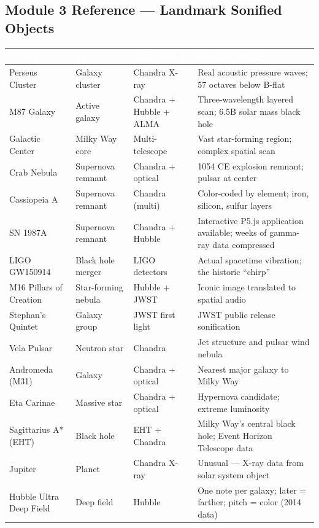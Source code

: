 \documentclass[11pt,letterpaper]{article}
\newcommand{\tableheader}[1]{\textbf{\sffamily\textcolor{white}{#1}}}
\begin{document}
\subsection{Module 3 Reference — Landmark Sonified Objects}

\begin{center}
\begin{tabularx}{\textwidth}{L{3.5cm}L{2.5cm}L{2.5cm}X}
\toprule
{}
\tableheader{Object} & \tableheader{Type} & \tableheader{Data Source} & \tableheader{Notable Feature} \\
\midrule
Perseus Cluster & Galaxy cluster & Chandra X-ray & Real acoustic pressure waves; 57 octaves below B-flat \\
M87 Galaxy & Active galaxy & Chandra + Hubble + ALMA & Three-wavelength layered scan; 6.5B solar mass black hole \\
Galactic Center & Milky Way core & Multi-telescope & Vast star-forming region; complex spatial scan \\
Crab Nebula & Supernova remnant & Chandra + optical & 1054 CE explosion remnant; pulsar at center \\
Cassiopeia A & Supernova remnant & Chandra (multi) & Color-coded by element; iron, silicon, sulfur layers \\
SN 1987A & Supernova remnant & Chandra + Hubble & Interactive P5.js application available; weeks of gamma-ray data compressed \\
LIGO GW150914 & Black hole merger & LIGO detectors & Actual spacetime vibration; the historic ``chirp'' \\
M16 Pillars of Creation & Star-forming nebula & Hubble + JWST & Iconic image translated to spatial audio \\
Stephan's Quintet & Galaxy group & JWST first light & JWST public release sonification \\
Vela Pulsar & Neutron star & Chandra & Jet structure and pulsar wind nebula \\
Andromeda (M31) & Galaxy & Chandra + optical & Nearest major galaxy to Milky Way \\
Eta Carinae & Massive star & Chandra + optical & Hypernova candidate; extreme luminosity \\
Sagittarius A* (EHT) & Black hole & EHT + Chandra & Milky Way's central black hole; Event Horizon Telescope data \\
Jupiter & Planet & Chandra X-ray & Unusual — X-ray data from solar system object \\
Hubble Ultra Deep Field & Deep field & Hubble & One note per galaxy; later = farther; pitch = color (2014 data) \\
\bottomrule
\end{tabularx}
\end{center}
\end{document}
